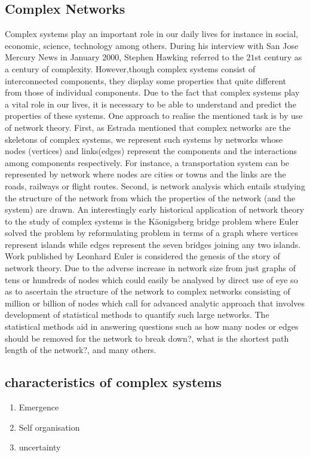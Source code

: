 \documentclass[10pt,a4paper]{article}
\begin{document}
	\subsection{Complex Networks}
	Complex systems play an important role in our daily lives for instance in social, economic, science, technology among others.  During his interview with San Jose Mercury News in January 2000, Stephen Hawking referred to the $21$st century as a century of complexity. However,though complex systems consist of interconnected components, they display some properties that quite different from those of individual components.  Due to the fact that complex systems play a vital role in our lives, it is necessary to be able to understand and predict the properties of these systems. One approach to realise the mentioned task is by use of network theory. First, as Estrada \citep{estrada2015first} mentioned that complex networks are the skeletons of complex systems, we represent such systems by networks whose nodes (vertices) and links(edges) represent the components and the interactions among components respectively. For instance, a transportation system can be represented by network where nodes are cities or towns and the links are the roads, railways or flight routes.  Second, is network analysis which entails studying the structure of the network from which the properties of the network (and the system) are drawn.
	An interestingly early historical application of network theory to the study of complex systems is the K\"{a}onigsberg bridge problem where Euler \citep{euler1976solution;euler1953leonhard} solved the problem by reformulating problem in terms of a graph where vertices represent islands while edges represent the seven bridges joining any two islands. Work published by Leonhard Euler \citep{euler1976solution} is considered the genesis of the story of network theory.
	Due to the adverse increase in network size from just graphs of tens or hundreds of nodes which could easily be analysed by direct use of eye so as to ascertain the structure of the network  to complex networks consisting of million or billion of nodes which call for advanced analytic approach that involves development of statistical methods to quantify such large networks. The statistical methods aid in answering questions such as how many nodes or edges should be removed for the network to break down?, what is the shortest path length of the network?, and many others. 
	
	
	\subsection{characteristics of complex systems}
	\begin{enumerate}
		\item Emergence
		\item Self organisation
		\item uncertainty
	\end{enumerate}
	
\end{document}
